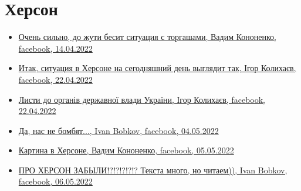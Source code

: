  
 
 
 
 

\section{Херсон}
\label{sec:topics.vojna.cities.herson}

\begin{itemize} %

\item \hyperlink{14_04_2022.fb.kononenko_vadim.herson.1.torgashi}{%
Очень сильно, до жути бесит ситуация с торгашами, Вадим Кононенко, facebook, 14.04.2022%
}

\item \hyperlink{22_04_2022.fb.kolyhaev_igor.herson.mer.1.herson}{%
Итак, ситуация в Херсоне на сегодняшний день выглядит так, Ігор Колихаєв, facebook, 22.04.2022%
}

\item \hyperlink{26_04_2022.fb.kolyhaev_igor.herson.mer.1.lysty}{%
Листи до органів державної влади України, Ігор Колихаєв, facebook, 22.04.2022%
}

\item \hyperlink{04_05_2022.fb.bobkov_ivan.1.nas_ne_bombjat}{%
Да, нас не бомбят..., Ivan Bobkov, facebook, 04.05.2022%
}

\item \hyperlink{05_05_2022.fb.kononenko_vadim.herson.1.kartina_v_hersone}{%
Картина в Херсоне, Вадим Кононенко, facebook, 05.05.2022%
}

\item \hyperlink{06_05_2022.fb.bobkov_ivan.1.pro_herson_zabyli}{%
ПРО ХЕРСОН ЗАБЫЛИ!?!?!?!?!?  Текста много, но читаем)), Ivan Bobkov, facebook, 06.05.2022%
}

\end{itemize} %
